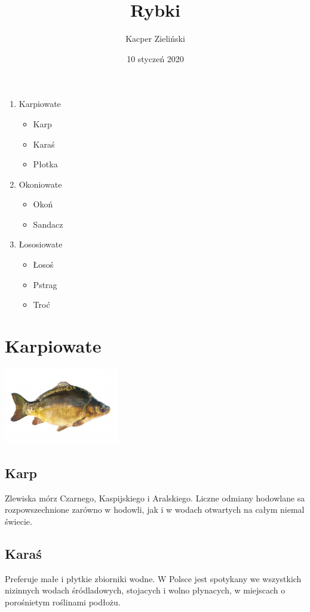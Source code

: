 \documentclass[12pt,a4paper,titlepage]{book}
\author{Kacper Zieliński}
\title{Rybki}
\date{10 styczeń 2020}
\begin{document}
\maketitle
\tableofcontents
\newpage
\begin{enumerate}
\item Karpiowate
\begin{itemize}
\item Karp
\item Karaś
\item Płotka
\end{itemize}
\item Okoniowate
\begin{itemize}
\item Okoń
\item Sandacz
\end{itemize}
\item Łososiowate
\begin{itemize}
\item Łosoś
\item Pstrag
\item Troć
\end{itemize}
\end{enumerate}

\chapter{Karpiowate}
\includegraphics[width=50mm,height=!]{karp}
\section{Karp}
Zlewiska mórz Czarnego, Kaspijskiego i Aralskiego. Liczne odmiany hodowlane sa rozpowszechnione zarówno w hodowli, jak i w wodach otwartych na całym niemal świecie.
\section{Karaś}
Preferuje małe i płytkie zbiorniki wodne. W Polsce jest spotykany we wszystkich nizinnych wodach śródladowych, stojacych i wolno płynacych, w miejscach o porośnietym roślinami podłożu.
\end{document}
